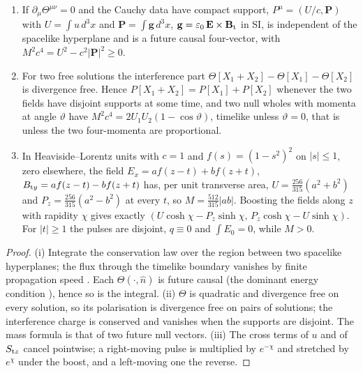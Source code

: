 \begin{proposition}
\label{r2:prop:whole}
\begin{enumerate}[label=(\roman*),leftmargin=2.2em]
\item If $\partial_\mu\Theta^{\mu\nu}=0$ and the Cauchy data have compact support, $P^\mu=(U/c,\mathbf P)$ with $U=\int u\,d^3x$ and $\mathbf P=\int\mathbf g\,d^3x$,
$\mathbf g=\varepsilon_0\,\mathbf E\times\mathbf B_{\rm t}$ in SI, is independent of the spacelike hyperplane and is a future causal four-vector, with
$M^2c^4=U^2-c^2|\mathbf P|^2\ge0$.
\item For two free solutions the interference part $\Theta[X_1+X_2]-\Theta[X_1]-\Theta[X_2]$ is divergence free. Hence $P[X_1+X_2]=P[X_1]+P[X_2]$
whenever the two fields have disjoint supports at some time, and two null wholes with momenta at angle $\vartheta$ have
$M^2c^4=2U_1U_2(1-\cos\vartheta)$, timelike unless $\vartheta=0$, that is unless the two four-momenta are proportional.
\item In Heaviside--Lorentz units with $c=1$ and $f(s)=(1-s^2)^2$ on $|s|\le1$, zero elsewhere, the field $E_x=af(z-t)+bf(z+t)$,
$B_{{\rm t}y}=af(z-t)-bf(z+t)$ has, per unit transverse area, $U=\tfrac{256}{315}(a^2+b^2)$ and $P_z=\tfrac{256}{315}(a^2-b^2)$ at every $t$, so
$M=\tfrac{512}{315}|ab|$. Boosting the fields along $z$ with rapidity $\chi$ gives exactly $(U\cosh\chi-P_z\sinh\chi,\,P_z\cosh\chi-U\sinh\chi)$. For $|t|\ge1$ the
pulses are disjoint, $q\equiv0$ and $\int E_0=0$, while $M>0$.
\end{enumerate}
\end{proposition}

\begin{proof}
(i) Integrate the conservation law over the region between two spacelike hyperplanes; the flux through the timelike boundary vanishes by finite
propagation speed \cite{Laue1911,LandauLifshitz2}. Each $\Theta(\cdot,\hat n)$ is future causal (the dominant energy condition \cite{HawkingEllis73}), hence so
is the integral. (ii) $\Theta$ is quadratic and divergence free on every solution, so its polarisation is divergence free on pairs of solutions; the
interference charge is conserved and vanishes when the supports are disjoint. The mass formula is that of two future null vectors. (iii) The cross terms
of $u$ and of $S_{{\rm t}z}$ cancel pointwise; a right-moving pulse is multiplied by $e^{-\chi}$ and stretched by $e^\chi$ under the boost, and a left-moving one
the reverse.
\end{proof}

